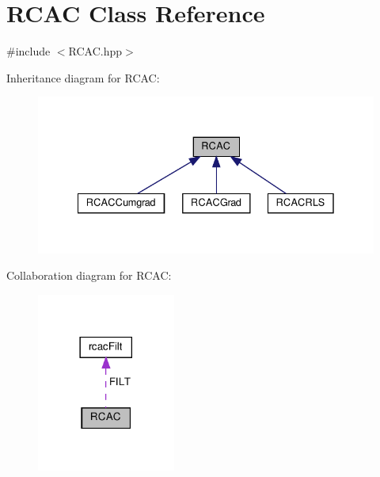 \hypertarget{class_r_c_a_c}{}\section{R\+C\+AC Class Reference}
\label{class_r_c_a_c}


{\ttfamily \#include $<$R\+C\+A\+C.\+hpp$>$}



Inheritance diagram for R\+C\+AC\+:
\nopagebreak
\begin{figure}[H]
\begin{center}
\leavevmode
\includegraphics[width=335pt]{class_r_c_a_c__inherit__graph}
\end{center}
\end{figure}


Collaboration diagram for R\+C\+AC\+:
\nopagebreak
\begin{figure}[H]
\begin{center}
\leavevmode
\includegraphics[width=129pt]{class_r_c_a_c__coll__graph}
\end{center}
\end{figure}
